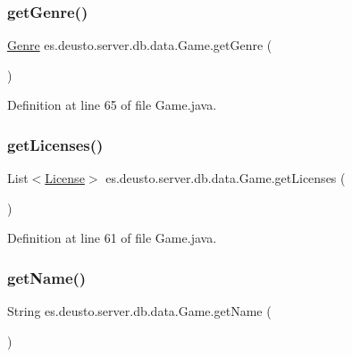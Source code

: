 \subsubsection{\texorpdfstring{get\+Genre()}{getGenre()}}
{\footnotesize\ttfamily \hyperlink{classes_1_1deusto_1_1server_1_1db_1_1data_1_1_genre}{Genre} es.\+deusto.\+server.\+db.\+data.\+Game.\+get\+Genre (\begin{DoxyParamCaption}{ }\end{DoxyParamCaption})}



Definition at line 65 of file Game.\+java.

\mbox{\label{classes_1_1deusto_1_1server_1_1db_1_1data_1_1_game_a6da5b38821b5c9bcb71b26721af09bf0}} 
\subsubsection{\texorpdfstring{get\+Licenses()}{getLicenses()}}
{\footnotesize\ttfamily List$<$\hyperlink{classes_1_1deusto_1_1server_1_1db_1_1data_1_1_license}{License}$>$ es.\+deusto.\+server.\+db.\+data.\+Game.\+get\+Licenses (\begin{DoxyParamCaption}{ }\end{DoxyParamCaption})}



Definition at line 61 of file Game.\+java.

\mbox{\label{classes_1_1deusto_1_1server_1_1db_1_1data_1_1_game_af9f6defe43d11cefdef169a6aaa87ae7}} 
\subsubsection{\texorpdfstring{get\+Name()}{getName()}}
{\footnotesize\ttfamily String es.\+deusto.\+server.\+db.\+data.\+Game.\+get\+Name (\begin{DoxyParamCaption}{ }\end{DoxyParamCaption})}



